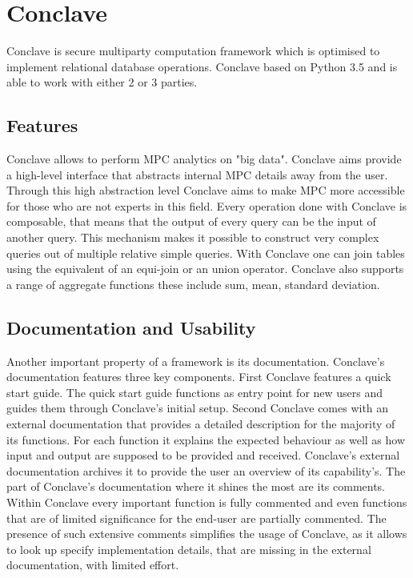 \section{Conclave}
Conclave \cite{10.1145/3302424.3303982} is secure multiparty computation framework which is optimised to implement relational database operations. Conclave based on Python 3.5 and is able to work with either 2 or 3 parties.
\subsection{Features}
 Conclave \cite{10.1145/3302424.3303982} allows to perform MPC analytics on "big data". Conclave aims provide a high-level interface that abstracts internal MPC details away from the user. Through this high abstraction level Conclave aims to make MPC more accessible for those who are not experts in this field.  Every operation done with Conclave is composable, that means that the output of every query can be the input of another query. This mechanism makes it possible to construct very complex queries out of multiple relative simple queries.  With Conclave one can join tables using the equivalent of an equi-join or an union operator. Conclave also supports a range of aggregate functions these include sum, mean, standard deviation. 
\subsection{Documentation and Usability}
Another important property of a framework is its documentation. Conclave's documentation features three key components. First Conclave features a quick start guide. The quick start guide functions as entry point for new users and guides them through Conclave's initial setup. 
Second Conclave comes with an external documentation that provides a detailed description for the majority of its functions. For each function it explains the expected behaviour as well as how input and output are supposed to be provided and received. Conclave's external documentation archives it to provide the user an overview of its capability's. 
The part of Conclave's documentation where it shines the most are its comments. Within Conclave every important function is fully commented and even functions that are of limited significance for the end-user are partially commented. The presence of such extensive comments simplifies the usage of Conclave, as it allows to look up specify implementation details, that are missing in the external documentation, with limited effort.    


